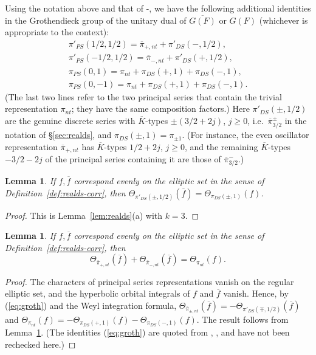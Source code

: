 \documentclass[12pt,letterpaper,openany]{book}
\theoremstyle{plain}
\newtheorem{lemma}[theorem]{Lemma}
\theoremstyle{definition}
\theoremstyle{remark}
\theoremstyle{remark}
\begin{document}
Using the notation above and that
of \cite{Ad1}-\cite{Ad2}, we have the following additional
identities in the Grothendieck group
of the unitary dual of $\overline{G(F)}$ or $G(F)$
(whichever is appropriate to the context):
\begin{equation}\label{eq:groth}
\begin{array}{c}
\pi'_{PS}(1/2,1/2)=\overline{\pi}_{+,nt}+\pi'_{DS}(-,1/2),\\
\pi'_{PS}(-1/2,1/2)=\overline{\pi}_{-,nt}+\pi'_{DS}(+,1/2),\\
\pi_{PS}(0,1)=\pi_{nt}+\pi_{DS}(+,1)+\pi_{DS}(-,1),\\
\pi_{PS}(0,-1)=\pi_{nt}+\pi_{DS}(+,1)+\pi_{DS}(-,1).
\end{array}
\end{equation}
(The last two lines refer to the two principal series that contain the
trivial representation $\pi_{nt}$; they have the same composition
factors.)
Here $\pi'_{DS}(\pm,1/2)$ are the genuine discrete series with
$\overline K$-types $\pm(3/2+2j)$, $j\ge0$, i.e.\
$\overline\pi{}^{\pm}_{3/2}$ in the notation of \S\ref{sec:realds}, and
$\pi_{DS}(\pm,1)=\pi_{\pm1}$. (For instance, the even oscillator
representation $\overline\pi_{+,nt}$ has $\overline K$-types
$1/2+2j$, $j\geq0$, and the remaining $\overline K$-types $-3/2-2j$ of the
principal series containing it are those of $\overline\pi{}^-_{3/2}$.)

\begin{lemma}\label{lem:ds-3/2} If
$f,\overline{f}$ correspond evenly on the elliptic set in
the sense of Definition~\ref{def:realds-corr}, then
$\Theta_{\pi'_{DS}(\pm,1/2)}(\overline{f})
=\Theta_{\pi_{DS}(\pm,1)}(f)$.
\end{lemma}

\begin{proof}
This is Lemma~\ref{lem:realds}(a) with $k=3$.
\end{proof}

\begin{lemma} If $f,\overline{f}$ correspond evenly on the elliptic set
in the sense of Definition~\ref{def:realds-corr}, then
\[
\Theta_{\overline{\pi}_{+,nt}}(\overline{f})
+\Theta_{\overline{\pi}_{-,nt}}(\overline{f})
=\Theta_{\pi_{nt}}(f).
\]
\end{lemma}

\begin{proof}
The characters of principal series representations
vanish on the regular elliptic set, and the hyperbolic orbital
integrals of $f$ and $\overline f$ vanish. Hence, by (\ref{eq:groth}) and
the Weyl integration formula,
$\Theta_{\overline{\pi}_{\pm,nt}}(\overline f)=-\Theta_{\pi'_{DS}(\mp,1/2)}(\overline f)$
and
$\Theta_{\pi_{nt}}(f)=-\Theta_{\pi_{DS}(+,1)}(f)-\Theta_{\pi_{DS}(-,1)}(f)$.
The result follows from Lemma~\ref{lem:ds-3/2}. (The identities
(\ref{eq:groth}) are quoted from \cite{Ad1}, \cite{Ge2}, and have not
been rechecked here.)
\end{proof}
\end{document}

